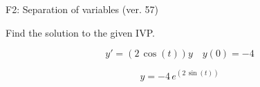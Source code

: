 \begin{exercise}
  \begin{exerciseTitle}F2: Separation of variables (ver. 57)\end{exerciseTitle}
  \begin{exerciseStatement}
    
Find the solution to the given IVP.

    
\[y'=( 2 \, \cos\left(t\right) )y\hspace{1em} y(0)= -4\]

  \end{exerciseStatement}
  \begin{exerciseAnswer}
    
\[y= -4 \, e^{\left(2 \, \sin\left(t\right)\right)}\]

  \end{exerciseAnswer}
\end{exercise}